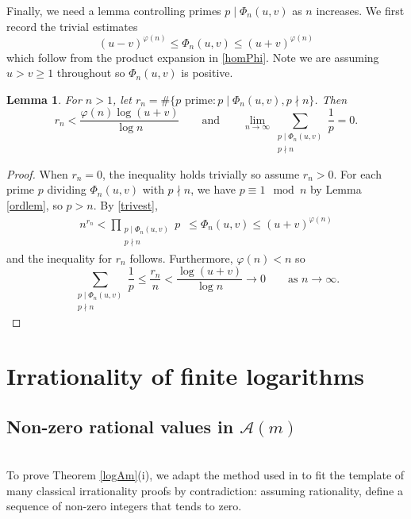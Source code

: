 \documentclass[10pt,a4paper]{amsart}
\newtheorem{lemma}[theorem]{Lemma}
\newcommand{\cA}{\mathcal A}
\begin{document}
Finally, we need a lemma controlling primes $p\mid\Phi_n(u,v)$ as $n$ increases. We first record the trivial estimates
\begin{equation}\label{trivest}
(u-v)^{\varphi(n)}\leq\Phi_n(u,v)\leq (u+v)^{\varphi(n)}
\end{equation}
which follow from the product expansion in \eqref{homPhi}. Note we are assuming $u>v\geq 1$ throughout so $\Phi_n(u,v)$ is positive.
\begin{lemma}\label{limlem}
For $n>1$, let $r_n=\#\{p\text{ prime} : p\mid\Phi_n(u,v), p\nmid n\}$. Then 
\[r_n<\frac{\varphi(n)\log(u+v)}{\log n}
\qquad\text{and}\qquad
\lim_{n\to\infty}\sum_{\substack{p\mid\Phi_n(u,v) \\ p\nmid n}}\frac{1}{p}=0.\]
\end{lemma}
\begin{proof}
When $r_n=0$, the inequality holds trivially so assume $r_n>0$. For each prime $p$ dividing $\Phi_n(u,v)$ with $p\nmid n$, 
we have $p\equiv 1\mod n$ by Lemma \ref{ordlem}, so $p>n$. By \eqref{trivest},
\begin{align*}
n^{r_n}<\prod_{\substack{p\mid\Phi_n(u,v) \\ p\nmid n}}\!\! p\;\ \leq \Phi_n(u,v)
\leq (u+v)^{\varphi(n)}
\end{align*}
and the inequality for $r_n$ follows. Furthermore, $\varphi(n)<n$ so
\[\sum_{\substack{p\mid\Phi_n(u,v) \\ p\nmid n}}\frac{1}{p}
\leq\frac{r_n}{n}
<\frac{\log(u+v)}{\log n}\longrightarrow 0\qquad\text{as $n\to\infty$.}\]
\vspace{-1cm}

\end{proof}


\section{Irrationality of finite logarithms}
\subsection{Non-zero rational values in $\cA(m)$} $\,$\\[3pt]
To prove Theorem \ref{logAm}(i), we adapt the method used in \cite{MS26} to fit the template of many classical irrationality proofs by contradiction: assuming rationality, define a sequence of non-zero integers that tends to zero.
\end{document}
